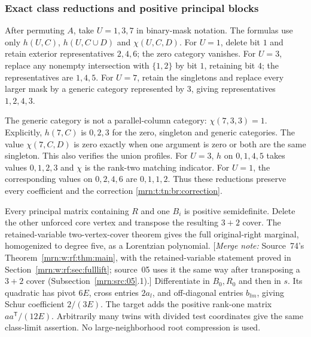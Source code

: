 \documentclass[11pt,a4paper]{article}
\theoremstyle{remark}\newtheorem{remark}[theorem]{Remark}
\newcommand{\mnote}[1]{[\textit{Merge note:} #1]}
\begin{document}
\subsubsection{Exact class reductions and positive principal blocks}
After permuting $A$, take $U=1,3,7$ in binary-mask notation. The formulas
use only $h(U,C)$, $h(U,C\cup D)$ and $\chi(U,C,D)$.
For $U=1$, delete bit $1$ and retain exterior representatives $2,4,6$;
the zero category vanishes. For $U=3$, replace any nonempty intersection
with $\{1,2\}$ by bit $1$, retaining bit $4$; the representatives are $1,4,5$.
For $U=7$, retain the singletons and replace every larger mask by a generic
category represented by $3$, giving representatives $1,2,4,3$.

The generic category is not a parallel-column category:
$\chi(7,3,3)=1$. Explicitly, $h(7,C)$ is $0,2,3$ for the zero, singleton
and generic categories. The value $\chi(7,C,D)$ is zero exactly when one
argument is zero or both are the same singleton. This also verifies the
union profiles. For $U=3$, $h$ on $0,1,4,5$ takes values $0,1,2,3$ and
$\chi$ is the rank-two matching indicator. For $U=1$, the corresponding
values on $0,2,4,6$ are $0,1,1,2$. Thus these reductions preserve every
coefficient and the correction \eqref{mrn:t:tn:br:correction}.

Every principal matrix containing $R$ and one $B_i$ is positive semidefinite.
Delete the other unforced core vertex and transpose the resulting $3+2$ cover.
The retained-variable two-vertex-cover theorem gives the full original-right
marginal, homogenized to degree five, as a Lorentzian polynomial.
\mnote{Source~74's Theorem~\ref{mrn:w:rf:thm:main}, with the retained-variable
statement proved in Section~\ref{mrn:w:rf:sec:fulllift}; source~05 uses it the
same way after transposing a $3+2$ cover (Subsection~\ref{mrn:src:05}.1).}
Differentiate in $B_0,R_0$ and then in $s$. Its quadratic has pivot $6E$,
cross entries $2a_l$, and off-diagonal entries $b_{lm}$, giving Schur
coefficient $2/(3E)$. The target adds the positive rank-one matrix
$aa^{\mathsf T}/(12E)$. Arbitrarily many twins with divided test coordinates
give the same class-limit assertion. No large-neighborhood root compression
is used.
\end{document}
